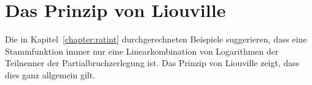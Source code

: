 %
%
%
\section{Das Prinzip von Liouville
\label{buch:intalg:section:liouville}}
%
Die in Kapitel~\ref{chapter:ratint} durchgerechneten Beispiele 
suggerieren, dass eine Stammfunktion immer nur eine Linearkombination
von Logarithmen der Teilnenner der Partialbruchzerlegung ist.
Das Prinzip von Liouville zeigt, dass dies ganz allgemein gilt.











